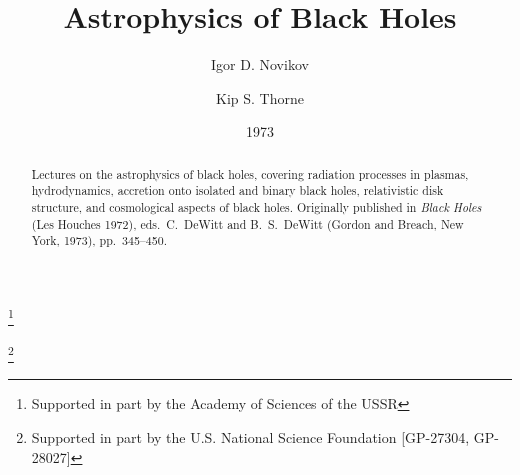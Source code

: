 \documentclass[aps,prd,onecolumn,superscriptaddress,nofootinbib,%
  longbibliography]{revtex4-2}
\numberwithin{equation}{section}
\begin{document}
\title{Astrophysics of Black Holes}

\author{Igor D. Novikov}
\thanks{Supported in part by the Academy of Sciences of the USSR}

\author{Kip S. Thorne}
\thanks{Supported in part by the U.S. National Science Foundation [GP-27304, GP-28027]}

\date{1973}

\begin{abstract}
Lectures on the astrophysics of black holes, covering radiation processes in plasmas,
hydrodynamics, accretion onto isolated and binary black holes, relativistic disk structure,
and cosmological aspects of black holes. Originally published in \textit{Black Holes}
(Les Houches 1972), eds.\ C.~DeWitt and B.~S.~DeWitt (Gordon and Breach, New York, 1973),
pp.~345--450.
\end{abstract}

\maketitle
\tableofcontents














\end{document}
